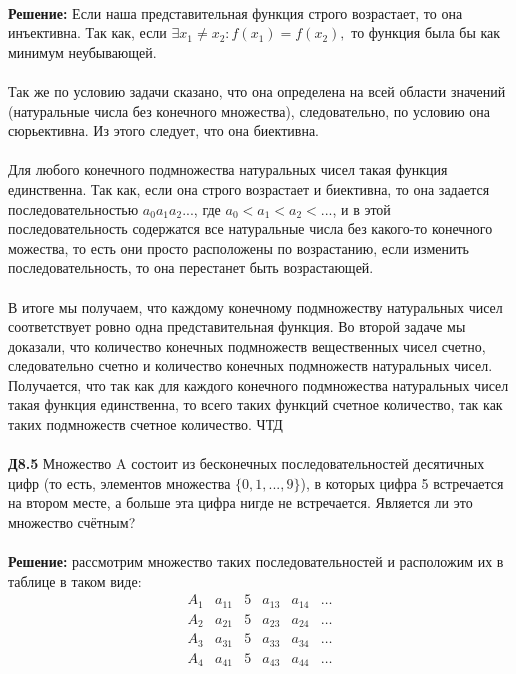 \documentclass[a4paper, 12pt]{article}
\begin{document}
    \\  \textbf{Решение: } Если наша представительная функция строго возрастает, то она инъективна. Так как, если $\exists x_1 \neq x_2 : f(x_1) = f(x_2),$ то функция была бы как минимум неубывающей. 
    \\
    \\ Так же по условию задачи сказано, что она определена на всей области значений (натуральные числа без конечного множества), следовательно, по условию она сюрьективна. Из этого следует, что она биективна.
    \\
    \\ Для любого конечного подмножества натуральных чисел такая функция единственна. Так как, если она строго возрастает и биективна, то она задается последовательностью $a_0 a_1 a_2 ...$, где $a_0 < a_1 < a_2 < ...$, и в этой последовательность содержатся все натуральные числа без какого-то конечного можества, то есть они просто расположены по возрастанию, если изменить последовательность, то она перестанет быть возрастающей.
    \\
    \\ В итоге мы получаем, что каждому конечному подмножеству натуральных чисел соответствует ровно одна представительная функция. Во второй задаче мы доказали, что количество конечных подмножеств вещественных чисел счетно, следовательно счетно и количество конечных подмножеств натуральных чисел. Получается, что так как для каждого конечного подмножества натуральных чисел такая функция единственна, то всего таких функций счетное количество, так как таких подмножеств счетное количество. ЧТД
    \\
    \\ \textbf{Д8.5} Множество A состоит из бесконечных последовательностей десятичных цифр (то есть, элементов
    множества $\{0, 1, . . . , 9\}$), в которых цифра 5 встречается на втором месте, а больше эта цифра нигде
    не встречается. Является ли это множество счётным?
    \\
    \\ \textbf{Решение: } рассмотрим множество таких последовательностей и расположим их в таблице в таком виде:
    \[
        \begin{matrix}
            A_1 & a_{11} & 5 & a_{13} & a_{14} & \dots \\
            A_2 & a_{21} & 5 & a_{23} & a_{24} & \dots \\
            A_3 & a_{31} & 5 & a_{33} & a_{34} & \dots \\
            A_4 & a_{41} & 5 & a_{43} & a_{44} & \dots \\
        \end{matrix}     
    \]
\end{document}
